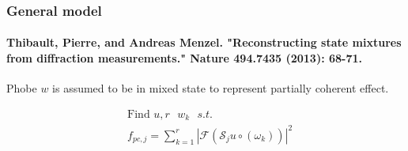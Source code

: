 \documentclass[UTF8]{beamer}
\begin{document}
\begin{frame}[c]\frametitle{General model}
\framesubtitle{Thibault, Pierre, and Andreas Menzel. "Reconstructing state mixtures from diffraction measurements." Nature 494.7435 (2013): 68-71.}




Phobe $w$ is assumed to be in mixed state to represent partially coherent effect.

\begin{equation}
\label{model:sep} 
\begin{aligned}
&\mbox{Find } u, r \mbox{ $w_k$   }s.t. \\
&f_{p c, j}=\sum_{k=1}^r \left|\mathcal{F}\left( \mathcal{S}_{j} u \circ \left(\omega_k\right) \right)\right|^{2}  
\end{aligned}
\end{equation}
\end{frame}
\end{document}
